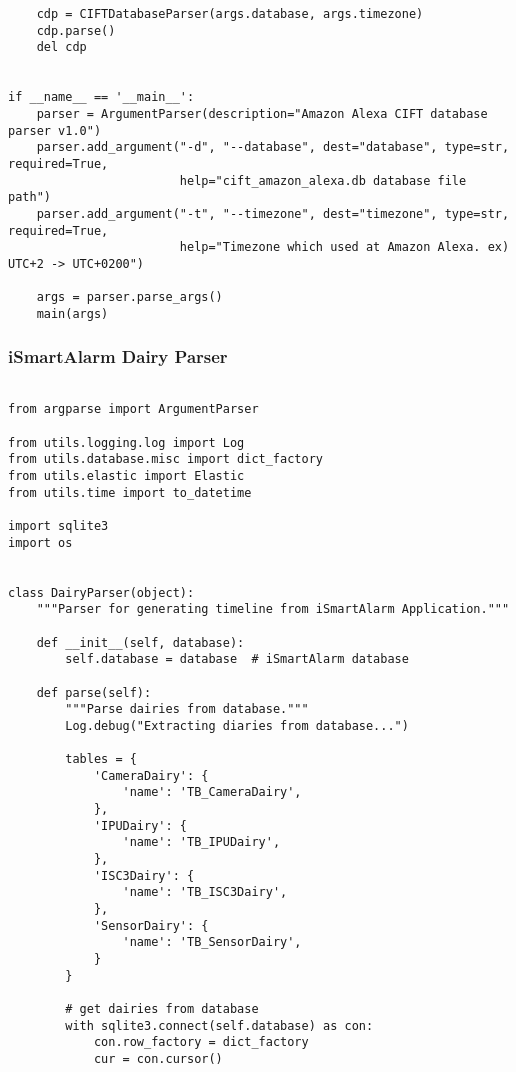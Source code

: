 \documentclass{easychair}
\begin{document}
\begin{enumerate}
\begin{lstlisting}
    cdp = CIFTDatabaseParser(args.database, args.timezone)
    cdp.parse()
    del cdp


if __name__ == '__main__':
    parser = ArgumentParser(description="Amazon Alexa CIFT database parser v1.0")
    parser.add_argument("-d", "--database", dest="database", type=str, required=True,
                        help="cift_amazon_alexa.db database file path")
    parser.add_argument("-t", "--timezone", dest="timezone", type=str, required=True,
                        help="Timezone which used at Amazon Alexa. ex) UTC+2 -> UTC+0200")

    args = parser.parse_args()
    main(args)

\end{lstlisting}


    
\subsubsection{iSmartAlarm Dairy Parser}


\lstset{language=Python}
\lstset{frame=lines}
\lstset{basicstyle=\footnotesize}
\begin{lstlisting}

from argparse import ArgumentParser

from utils.logging.log import Log
from utils.database.misc import dict_factory
from utils.elastic import Elastic
from utils.time import to_datetime

import sqlite3
import os


class DairyParser(object):
    """Parser for generating timeline from iSmartAlarm Application."""

    def __init__(self, database):
        self.database = database  # iSmartAlarm database

    def parse(self):
        """Parse dairies from database."""
        Log.debug("Extracting diaries from database...")

        tables = {
            'CameraDairy': {
                'name': 'TB_CameraDairy',
            },
            'IPUDairy': {
                'name': 'TB_IPUDairy',
            },
            'ISC3Dairy': {
                'name': 'TB_ISC3Dairy',
            },
            'SensorDairy': {
                'name': 'TB_SensorDairy',
            }
        }

        # get dairies from database
        with sqlite3.connect(self.database) as con:
            con.row_factory = dict_factory
            cur = con.cursor()


\end{lstlisting}
\end{enumerate}
\end{document}
